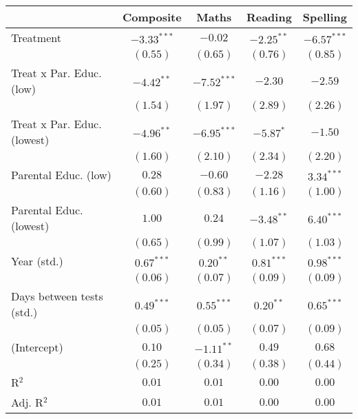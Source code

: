 
\begin{table}
\begin{center}
\begin{tabular}{l c c c c}
\hline
 & Composite & Maths & Reading & Spelling \\
\hline
Treatment                   & $-3.33^{***}$ & $-0.02$       & $-2.25^{**}$ & $-6.57^{***}$ \\
                            & $(0.55)$      & $(0.65)$      & $(0.76)$     & $(0.85)$      \\
Treat x Par. Educ. (low)    & $-4.42^{**}$  & $-7.52^{***}$ & $-2.30$      & $-2.59$       \\
                            & $(1.54)$      & $(1.97)$      & $(2.89)$     & $(2.26)$      \\
Treat x Par. Educ. (lowest) & $-4.96^{**}$  & $-6.95^{***}$ & $-5.87^{*}$  & $-1.50$       \\
                            & $(1.60)$      & $(2.10)$      & $(2.34)$     & $(2.20)$      \\
Parental Educ. (low)        & $0.28$        & $-0.60$       & $-2.28$      & $3.34^{***}$  \\
                            & $(0.60)$      & $(0.83)$      & $(1.16)$     & $(1.00)$      \\
Parental Educ. (lowest)     & $1.00$        & $0.24$        & $-3.48^{**}$ & $6.40^{***}$  \\
                            & $(0.65)$      & $(0.99)$      & $(1.07)$     & $(1.03)$      \\
Year (std.)                 & $0.67^{***}$  & $0.20^{**}$   & $0.81^{***}$ & $0.98^{***}$  \\
                            & $(0.06)$      & $(0.07)$      & $(0.09)$     & $(0.09)$      \\
Days between tests (std.)   & $0.49^{***}$  & $0.55^{***}$  & $0.20^{**}$  & $0.65^{***}$  \\
                            & $(0.05)$      & $(0.05)$      & $(0.07)$     & $(0.09)$      \\
(Intercept)                 & $0.10$        & $-1.11^{**}$  & $0.49$       & $0.68$        \\
                            & $(0.25)$      & $(0.34)$      & $(0.38)$     & $(0.44)$      \\
\hline
R$^2$                       & $0.01$        & $0.01$        & $0.00$       & $0.00$        \\
Adj. R$^2$                  & $0.01$        & $0.01$        & $0.00$       & $0.00$        \\

\end{tabular}
\end{center}
\end{table}
